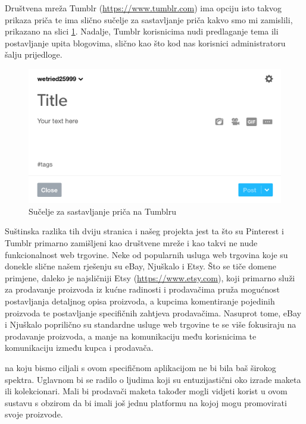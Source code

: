 		Društvena mreža Tumblr (\url{https://www.tumblr.com}) ima opciju isto takvog prikaza priča te ima slično sučelje za sastavljanje priča kakvo smo mi zamislili, prikazano na slici \ref{fig:tumblr}. Nadalje, Tumblr korisnicima nudi predlaganje tema ili postavljanje upita blogovima, slično kao što kod nas korisnici administratoru šalju prijedloge.
		
		\begin{figure}[H]
			\includegraphics[scale=0.5]{slike/tumblr.PNG} %
			\centering
			\caption{Sučelje za sastavljanje priča na Tumblru}
			\label{fig:tumblr}
		\end{figure}
	
		Suštinska razlika tih dviju stranica i našeg projekta jest ta što su Pinterest i Tumblr primarno zamišljeni kao društvene mreže i kao takvi ne nude funkcionalnost web trgovine. Neke od popularnih usluga web trgovina koje su donekle slične našem rješenju su eBay, Njuškalo i Etsy. Što se tiče domene primjene, daleko je najsličniji Etsy (\url{https://www.etsy.com}), koji primarno služi za prodavanje proizvoda iz kućne radinosti i prodavačima pruža mogućnost postavljanja detaljnog opisa proizvoda, a kupcima komentiranje pojedinih proizvoda te postavljanje specifičnih zahtjeva prodavačima. Nasuprot tome, eBay i Njuškalo poprilično su standardne usluge web trgovine te se više fokusiraju na prodavanje proizvoda, a manje na komunikaciju među korisnicima te komunikaciju između kupca i prodavača.
		
		 na koju bismo ciljali s ovom specifičnom aplikacijom ne bi bila baš širokog spektra. Uglavnom bi se radilo o ljudima koji su entuzijastični oko izrade maketa ili kolekcionari. Mali bi prodavači maketa također mogli vidjeti korist u ovom sustavu s obzirom da bi imali još jednu platformu na kojoj mogu promovirati svoje proizvode.
		
